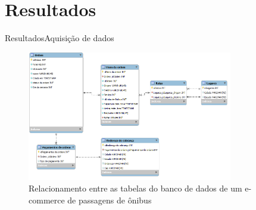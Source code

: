 \section[Resultados]{Resultados}

\begin{frame}{Resultados}{Aquisição de dados}
\begin{center}
\begin{figure}[ht]
    \includegraphics[width=0.8\textwidth]{../img/estrutura-banco-de-dados}
    \caption{Relacionamento entre as tabelas do banco de dados de um e-commerce de passagens de ônibus}
    \label{fig:bd-clickbus}
\end{figure}
\end{center}
\end{frame}